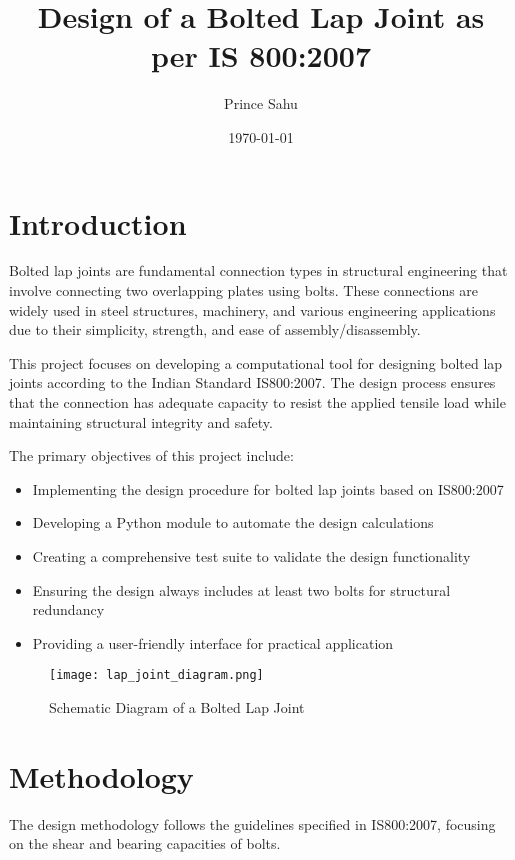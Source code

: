 \documentclass[12pt,a4paper]{article}
\title{Design of a Bolted Lap Joint as per IS 800:2007}
\author{Prince Sahu}
\date{\today}
\begin{document}
\maketitle
\tableofcontents
\newpage

\section{Introduction}
Bolted lap joints are fundamental connection types in structural engineering that involve connecting two overlapping plates using bolts. These connections are widely used in steel structures, machinery, and various engineering applications due to their simplicity, strength, and ease of assembly/disassembly.

This project focuses on developing a computational tool for designing bolted lap joints according to the Indian Standard IS800:2007. The design process ensures that the connection has adequate capacity to resist the applied tensile load while maintaining structural integrity and safety.

The primary objectives of this project include:
\begin{itemize}
    \item Implementing the design procedure for bolted lap joints based on IS800:2007
    \item Developing a Python module to automate the design calculations
    \item Creating a comprehensive test suite to validate the design functionality
    \item Ensuring the design always includes at least two bolts for structural redundancy
    \item Providing a user-friendly interface for practical application
\end{itemize}

\begin{figure}[H]
\centering
\texttt{[image: lap\_joint\_diagram.png]}
\caption{Schematic Diagram of a Bolted Lap Joint}
\label{fig:lap_joint}
\end{figure}

\section{Methodology}
The design methodology follows the guidelines specified in IS800:2007, focusing on the shear and bearing capacities of bolts.
\end{document}
